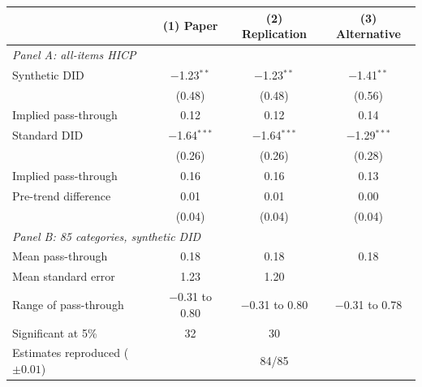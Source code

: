 \begin{tabular}{lccc}
\toprule
 & (1) Paper & (2) Replication & (3) Alternative \\
\midrule
\multicolumn{4}{l}{\textit{Panel A: all-items HICP}} \\
Synthetic DID & $-$1.23$^{**}$ & $-$1.23$^{**}$ & $-$1.41$^{**}$ \\
 & (0.48) & (0.48) & (0.56) \\
Implied pass-through & 0.12 & 0.12 & 0.14 \\
Standard DID & $-$1.64$^{***}$ & $-$1.64$^{***}$ & $-$1.29$^{***}$ \\
 & (0.26) & (0.26) & (0.28) \\
Implied pass-through & 0.16 & 0.16 & 0.13 \\
Pre-trend difference & 0.01 & 0.01 & 0.00 \\
 & (0.04) & (0.04) & (0.04) \\
\midrule
\multicolumn{4}{l}{\textit{Panel B: 85 categories, synthetic DID}} \\
Mean pass-through & 0.18 & 0.18 & 0.18 \\
Mean standard error & 1.23 & 1.20 & \\
Range of pass-through & $-$0.31 to 0.80 & $-$0.31 to 0.80 & $-$0.31 to 0.78 \\
Significant at 5\% & 32 & 30 & \\
Estimates reproduced ($\pm 0.01$) & & 84/85 & \\
\bottomrule
\end{tabular}
